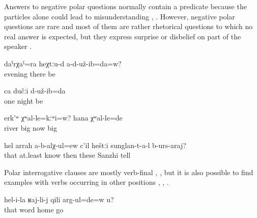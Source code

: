 Answers to negative polar questions normally contain a predicate because the particles alone could lead to misunderstanding , . However, negative polar questions are rare and most of them are rather rhetorical questions to which no real answer is expected, but they express surprise or disbelief on part of the speaker . 
%
\begin{exe}
	\ex	\label{ex:Did you not also spend the night there? We stayed one night}
	\begin{xlist}
		\ex	\label{ex:Did you not also spend the night there? We stayed one night@A}
		\gll	daˁrχaˁ=ra	heχtːu-d	a-d-už-ib=da=w?\\
			evening	there	be\\
		\glt	{}

		\ex	\label{ex:Did you not also spend the night there? We stayed one night@B}
		\gll	ca	dučːi	d-už-ib=da\\
			one	night	be\\
		\glt	{}
	\end{xlist}

	\ex	\label{ex:Was the river not big? Now it was big}
	\gll	erk'ʷ	χʷal-le=kːʷi=w? 	hana	χʷal-le=de\\
		river	big 	now	big\\
	\glt	{}

	\ex	\label{ex:‎Don't the Sanzhi people know at least that (story) to tell}
	\gll	hel	arrah	a-b-alχ-ul=ew	c'il	heštːi	sunglan-t-a-l	b-urs-araj?\\
		that	at.least	know	then	these	Sanzhi	tell	\\
	\glt	{}
\end{exe}

Polar interrogative clauses are mostly verb-final , , but it is also possible to find examples with verbs occurring in other positions , , .
%
\begin{exe}
	\ex	\label{ex:Are you going home because of what she said}
	\gll	hel-i-la	ʁaj-li-j	qili	arg-ul=de=w	u?	\\
		that	word	home	go		\\
	\glt	{}
\end{exe}

